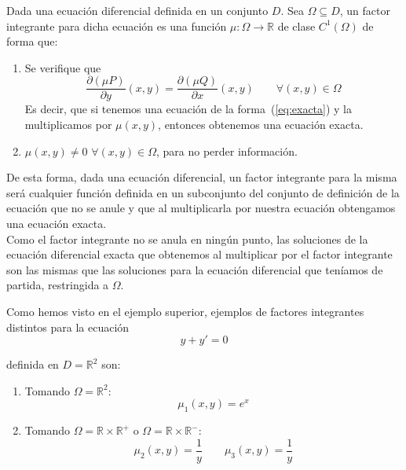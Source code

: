 \begin{definicion}
    Dada una ecuación diferencial definida en un conjunto $D$. Sea $\Omega\subseteq D$, un factor integrante para dicha ecuación es una función $\mu:\Omega\rightarrow\mathbb{R}$ de clase $C^1(\Omega)$ de forma que:
    \begin{enumerate}[label=\arabic*)]
        \item Se verifique que
            \begin{equation}\label{eq:condicion_fi}
                \dfrac{\partial (\mu P)}{\partial y}(x,y) = \dfrac{\partial (\mu Q)}{\partial x}(x,y) \qquad \forall (x,y)\in \Omega
            \end{equation}
            Es decir, que si tenemos una ecuación de la forma~(\ref{eq:exacta}) y la multiplicamos por $\mu(x,y)$, entonces obtenemos una ecuación exacta.
        \item$\mu(x,y)\neq 0$ $\forall (x,y)\in \Omega$, para no perder información.
    \end{enumerate}
\end{definicion}

\noindent
De esta forma, dada una ecuación diferencial, un factor integrante para la misma será cualquier función definida en un subconjunto del conjunto de definición de la ecuación que no se anule y que al multiplicarla por nuestra ecuación obtengamos una ecuación exacta.\\

Como el factor integrante no se anula en ningún punto, las soluciones de la ecuación diferencial exacta que obtenemos al multiplicar por el factor integrante son las mismas que las soluciones para la ecuación diferencial que teníamos de partida, restringida a $\Omega$.

\begin{ejemplo}
    Como hemos visto en el ejemplo superior, ejemplos de factores integrantes distintos para la ecuación 
    \begin{equation*}
        y + y' = 0
    \end{equation*}

    definida en $D=\mathbb{R}^2$ son:
    \begin{enumerate}
        \item Tomando $\Omega=\mathbb{R}^2$:
            \begin{equation*}
                \mu_1(x,y) = e^x
            \end{equation*}
        \item Tomando $\Omega=\mathbb{R}\times\mathbb{R}^+$ o $\Omega=\mathbb{R}\times \mathbb{R}^-$:
            \begin{equation*}
                \mu_2(x,y) = \dfrac{1}{y} \qquad \mu_3(x,y) = \dfrac{1}{y}
            \end{equation*}
    \end{enumerate}
\end{ejemplo}

